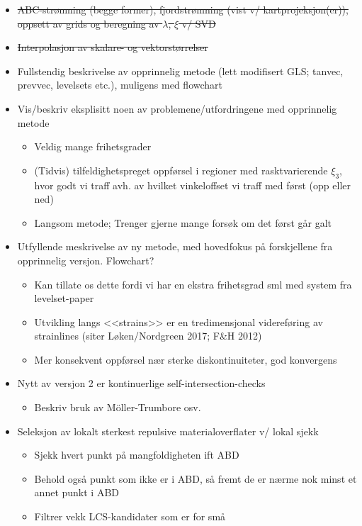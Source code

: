 \cleartorecto
\begin{framed}
    \begin{itemize}
        \item \sout{ABC-strømning (begge former), fjordstrømning (vist v/ kartprojeksjon(er)),
            oppsett av grids og beregning av $\lambda$, $\xi$ v/ SVD}
        \item \sout{Interpolasjon av skalare- og vektorstørrelser}
        \item Fullstendig beskrivelse av opprinnelig metode (lett modifisert GLS; tanvec, prevvec, levelsets etc.),
            muligens med flowchart
        \item Vis/beskriv eksplisitt noen av problemene/utfordringene med opprinnelig metode
            \begin{itemize}
                \item Veldig mange frihetsgrader
                \item (Tidvis) tilfeldighetspreget oppførsel i regioner med rasktvarierende $\xi_{3}$,
                    hvor godt vi traff avh. av hvilket vinkeloffset vi traff med først (opp eller ned)
                \item Langsom metode; Trenger gjerne mange forsøk om det først går galt
            \end{itemize}
        \item Utfyllende meskrivelse av ny metode, med hovedfokus på forskjellene fra opprinnelig versjon.
            Flowchart?
            \begin{itemize}
                \item Kan tillate os dette fordi vi har en ekstra frihetsgrad sml med system fra levelset-paper
                \item Utvikling langs <<strains>> er en tredimensjonal videreføring av strainlines (siter Løken/Nordgreen 2017; F\&H 2012)
                \item Mer konsekvent oppførsel nær sterke diskontinuiteter, god konvergens
            \end{itemize}
        \item Nytt av versjon 2 er kontinuerlige self-intersection-checks
            \begin{itemize}
                \item Beskriv bruk av Möller-Trumbore osv.
            \end{itemize}
        \item Seleksjon av lokalt sterkest repulsive materialoverflater v/ lokal sjekk
            \begin{itemize}
                \item Sjekk hvert punkt på mangfoldigheten ift ABD
                \item Behold også punkt som ikke er i ABD, så fremt de er nærme nok minst et annet punkt i ABD
                \item Filtrer vekk LCS-kandidater som er for små
            \end{itemize}
    \end{itemize}
\end{framed}
